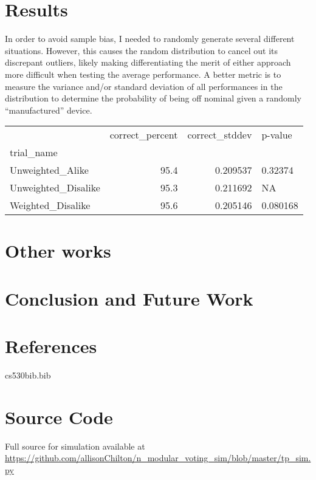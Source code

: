 \documentclass[article]{IEEEtran}
\begin{document}
\section{Results}
In order to avoid sample bias, I needed to randomly generate several different situations. However, this causes the random distribution to cancel out its discrepant outliers, likely making differentiating the merit of either approach more difficult when testing the average performance. A better metric is to measure the variance and/or standard deviation of all performances in the distribution to determine the probability of being off nominal given a randomly “manufactured” device.

\begin{tabular}{lrrl}
\toprule
{} &  correct\_percent &  correct\_stddev &   p-value \\
trial\_name          &                  &                 &           \\
\midrule
Unweighted\_Alike    &             95.4 &        0.209537 &   0.32374 \\
Unweighted\_Disalike &             95.3 &        0.211692 &      NA \\
Weighted\_Disalike   &             95.6 &        0.205146 &  0.080168 \\
\bottomrule
\end{tabular}

\section{Other works}
\section{Conclusion and Future Work}
\section{References}

\begin{filecontents}[overwrite]{cs530bib.bib}


\end{filecontents}

%
\appendix
\section{Source Code}
Full source for simulation available at \url{ https://github.com/allisonChilton/n_modular_voting_sim/blob/master/tp_sim.py}
\end{document}
